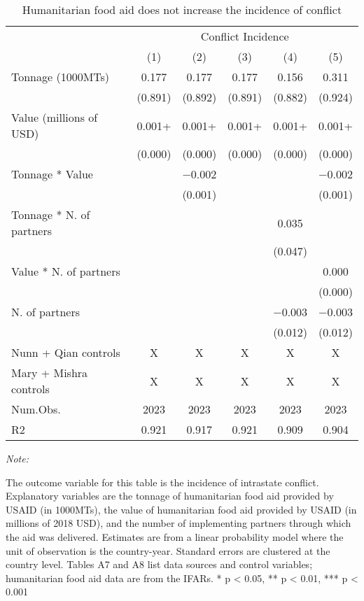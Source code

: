 \begin{table}
\centering\centering
\caption{Humanitarian food aid does not increase the incidence of conflict \label{direct_value_tonnage}}
\centering
\fontsize{8}{10}\selectfont
\begin{threeparttable}
\begin{tabular}[t]{lccccc}
\toprule
\multicolumn{1}{c}{ } & \multicolumn{5}{c}{Conflict Incidence} \\
\cmidrule(l{3pt}r{3pt}){2-6}
  & (1) & (2) & (3) & (4) & (5)\\
\midrule
Tonnage (1000MTs) & \num{0.177} & \num{0.177} & \num{0.177} & \num{0.156} & \num{0.311}\\
 & (\num{0.891}) & (\num{0.892}) & (\num{0.891}) & (\num{0.882}) & (\num{0.924})\\
Value (millions of USD) & \num{0.001}+ & \num{0.001}+ & \num{0.001}+ & \num{0.001}+ & \num{0.001}+\\
 & (\num{0.000}) & (\num{0.000}) & (\num{0.000}) & (\num{0.000}) & (\num{0.000})\\
Tonnage * Value &  & \num{-0.002} &  &  & \num{-0.002}\\
 &  & (\num{0.001}) &  &  & (\num{0.001})\\
Tonnage * N. of partners &  &  &  & \num{0.035} & \\
 &  &  &  & (\num{0.047}) & \\
Value * N. of partners &  &  &  &  & \num{0.000}\\
 &  &  &  &  & (\num{0.000})\\
N. of partners &  &  &  & \num{-0.003} & \num{-0.003}\\
 &  &  &  & (\num{0.012}) & (\num{0.012})\\
\midrule
Nunn + Qian controls & X & X & X & X & X\\
Mary + Mishra controls & X & X & X & X & X\\
Num.Obs. & \num{2023} & \num{2023} & \num{2023} & \num{2023} & \num{2023}\\
R2 & \num{0.921} & \num{0.917} & \num{0.921} & \num{0.909} & \num{0.904}\\
\bottomrule
\end{tabular}
\begin{tablenotes}[para]
\item \textit{Note: } 
\item The outcome variable for this table is the incidence of intrastate conflict. Explanatory variables are the tonnage of humanitarian food aid provided by USAID (in 1000MTs), the value of humanitarian food aid provided by USAID (in millions of 2018 USD), and the number of implementing partners through which the aid was delivered. Estimates are from a linear probability model where the unit of observation is the country-year. Standard errors are clustered at the country level. Tables A7 and A8 list data sources and control variables; humanitarian food aid data are from the IFARs. * p < 0.05, ** p < 0.01, *** p < 0.001
\end{tablenotes}
\end{threeparttable}
\end{table}

